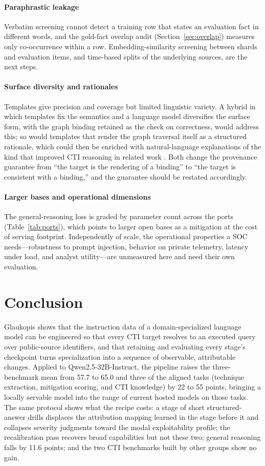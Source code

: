 \documentclass[twocolumn]{svjour3}
\begin{document}
\paragraph{Paraphrastic leakage}
Verbatim screening cannot detect a training row that states an evaluation fact in different words, and the gold-fact overlap audit (Section~\ref{sec:overlap}) measures only co-occurrence within a row. Embedding-similarity screening between shards and evaluation items, and time-based splits of the underlying sources, are the next steps.

\paragraph{Surface diversity and rationales}
Templates give precision and coverage but limited linguistic variety. A hybrid in which templates fix the semantics and a language model diversifies the surface form, with the graph binding retained as the check on correctness, would address this; so would templates that render the graph traversal itself as a structured rationale, which could then be enriched with natural-language explanations of the kind that improved CTI reasoning in related work \cite{levi2025toward}. Both change the provenance guarantee from ``the target is the rendering of a binding'' to ``the target is consistent with a binding,'' and the guarantee should be restated accordingly.

\paragraph{Larger bases and operational dimensions}
The general-reasoning loss is graded by parameter count across the ports (Table~\ref{tab:ports}), which points to larger open bases as a mitigation at the cost of serving footprint. Independently of scale, the operational properties a SOC needs---robustness to prompt injection, behavior on private telemetry, latency under load, and analyst utility---are unmeasured here and need their own evaluation.

\section{Conclusion}\label{sec:conclusion}
Glaukopis shows that the instruction data of a domain-specialized language model can be engineered so that every CTI target resolves to an executed query over public-source identifiers, and that retaining and evaluating every stage's checkpoint turns specialization into a sequence of observable, attributable changes. Applied to Qwen2.5-32B-Instruct, the pipeline raises the three-benchmark mean from 57.7 to 65.0 and three of the aligned tasks (technique extraction, mitigation scoring, and CTI knowledge) by 22 to 55 points, bringing a locally servable model into the range of current hosted models on those tasks. The same protocol shows what the recipe costs: a stage of short structured-answer drills displaces the attribution mapping learned in the stage before it and collapses severity judgments toward the modal exploitability profile; the recalibration pass recovers broad capabilities but not these two; general reasoning falls by 11.6 points; and the two CTI benchmarks built by other groups show no gain.
\end{document}
